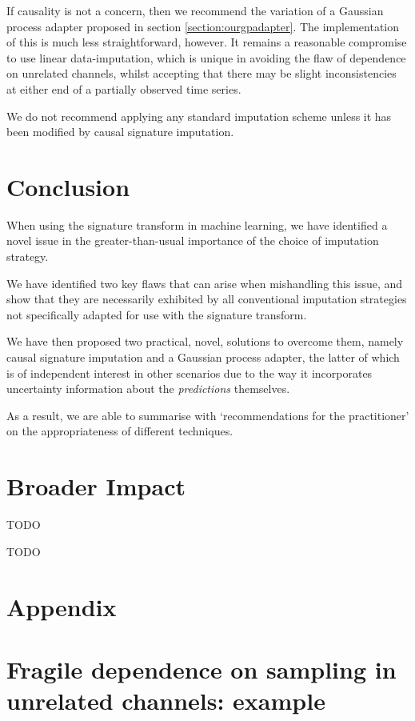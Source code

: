 \documentclass{article}
\begin{document}
If causality is not a concern, then we recommend the variation of a Gaussian process adapter proposed in section \ref{section:ourgpadapter}. The implementation of this is much less straightforward, however. It remains a reasonable compromise to use linear data-imputation, which is unique in avoiding the flaw of dependence on unrelated channels, whilst accepting that there may be slight inconsistencies at either end of a partially observed time series.

We do not recommend applying any standard imputation scheme unless it has been modified by causal signature imputation.

\section{Conclusion}
When using the signature transform in machine learning, we have identified a novel issue in the greater-than-usual importance of the choice of imputation strategy.

We have identified two key flaws that can arise when mishandling this issue, and show that they are necessarily exhibited by all conventional imputation strategies not specifically adapted for use with the signature transform.

We have then proposed two practical, novel, solutions to overcome them,
namely causal signature imputation and a Gaussian process adapter, the
latter of which is of independent interest in other scenarios due to the
way it incorporates uncertainty information about the \emph{predictions}
themselves.

As a result, we are able to summarise with `recommendations for the practitioner' on the appropriateness of different techniques.

\section*{Broader Impact}
TODO

\begin{ack}
TODO
\end{ack}


\newpage
\appendix

\section{Appendix}\label{sec:Appendix}

\section{Fragile dependence on sampling in unrelated channels: example}%
\label{sec:Fragile dependence} 
\end{document}
